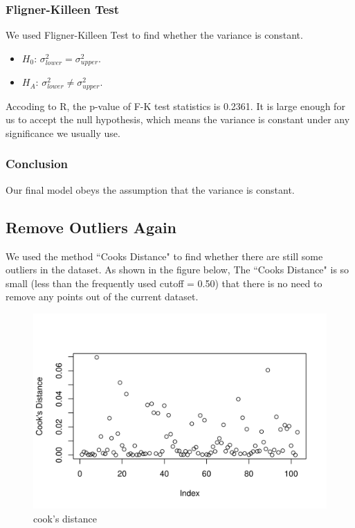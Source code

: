 \documentclass[a4paper,11pt,onecolumn,twoside]{article}
\begin{document}
\subsubsection{Fligner-Killeen  Test}
We used Fligner-Killeen Test to find whether the variance is constant.
\begin{itemize}
	\item $H_0$: $\sigma^2_{lower}=\sigma^2_{upper}$.
	\item $H_A$: $\sigma^2_{lower}\neq\sigma^2_{upper}$.
\end{itemize}
Accoding to R, the p-value of F-K test statistics is 0.2361. It is large enough for us to accept the null hypothesis, which
means the variance is constant under any significance we usually use.
\subsubsection{Conclusion}
Our final model obeys the assumption that the variance is constant.
\subsection{Remove  Outliers Again}
We used the method ``Cooks Distance" to find whether there are still some outliers in the dataset. As shown in the figure below, The ``Cooks Distance" is so small (less than the frequently used cutoff = 0.50) that there is no need to remove any points out of the current dataset.
 \begin{figure}[H]
	\centering
	\includegraphics[width=.60\textwidth,height=.30\textheight]{cooks_distance.png} %
	\caption{cook's distance} %
	\label{img} %
\end{figure}
\end{document}
